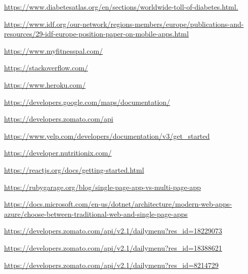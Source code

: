 \documentclass{article}
\begin{document}
\begin{thebibliography}{15}

\url{https://www.diabetesatlas.org/en/sections/worldwide-toll-of-diabetes.html.}

\url{https://www.idf.org/our-network/regions-members/europe/publications-and-resources/29-idf-europe-position-paper-on-mobile-apps.html}

\url{https://www.myfitnesspal.com/}

\url{https://stackoverflow.com/}

\url{https://www.heroku.com/}

\url{https://developers.google.com/maps/documentation/}

\url{https://developers.zomato.com/api}

\url{https://www.yelp.com/developers/documentation/v3/get_started}

\url{https://developer.nutritionix.com/}

\url{https://reactjs.org/docs/getting-started.html}

\url{https://rubygarage.org/blog/single-page-app-vs-multi-page-app}

\url{https://docs.microsoft.com/en-us/dotnet/architecture/modern-web-apps-azure/choose-between-traditional-web-and-single-page-apps}

\url{https://developers.zomato.com/api/v2.1/dailymenu?res_id=18229073}

\url{https://developers.zomato.com/api/v2.1/dailymenu?res_id=18388621}

\url{https://developers.zomato.com/api/v2.1/dailymenu?res_id=8214729}

\end{thebibliography}
\end{document}
